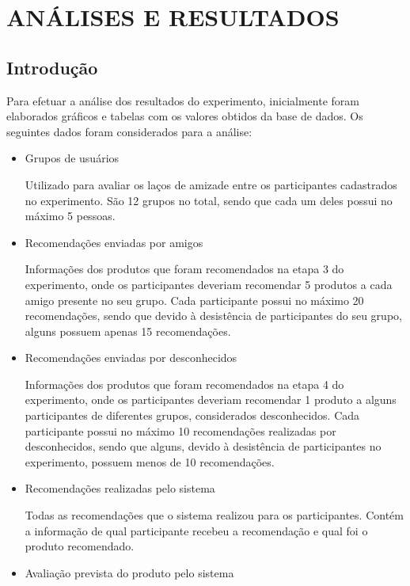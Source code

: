 \chapter{ANÁLISES E RESULTADOS} %
\label{cha:analises_e_resultados}

\section{Introdução}
\label{sec:introducao}

 Para efetuar a análise dos resultados do experimento, inicialmente foram elaborados gráficos e tabelas com os valores obtidos da base de dados. Os seguintes dados foram considerados para a análise:
 
\begin{itemize}
	\item Grupos de usuários
	
	\subitem Utilizado para avaliar os laços de amizade entre os participantes cadastrados no experimento. São 12 grupos no total, sendo que cada um deles possui no máximo 5 pessoas.
	
	\item Recomendações enviadas por amigos
	
	\subitem Informações dos produtos que foram recomendados na etapa 3 do experimento, onde os participantes deveriam recomendar 5 produtos a cada amigo presente no seu grupo. Cada participante possui no máximo 20 recomendações, sendo que devido à desistência de participantes do seu grupo, alguns possuem apenas 15 recomendações.
	
	\item Recomendações enviadas por desconhecidos
	
	\subitem Informações dos produtos que foram recomendados na etapa 4 do experimento, onde os participantes deveriam recomendar 1 produto a alguns participantes de diferentes grupos, considerados desconhecidos. Cada participante possui no máximo 10 recomendações realizadas por desconhecidos, sendo que alguns, devido à desistência de participantes no experimento, possuem menos de 10 recomendações.
	
	\item Recomendações realizadas pelo sistema
	
	\subitem Todas as recomendações que o sistema realizou para os participantes. Contém a informação de qual participante recebeu a recomendação e qual foi o produto recomendado.
	
	\item Avaliação prevista do produto pelo sistema
	

\end{itemize}
